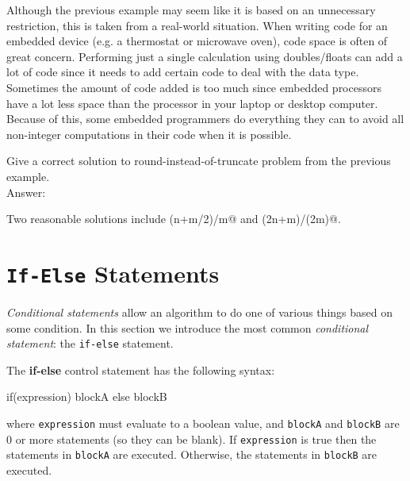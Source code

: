 Although the previous example may seem like it is based on an unnecessary restriction,
this is taken from a real-world situation.  
When writing code for an embedded device (e.g. a thermostat or microwave oven), code space
is often of great concern.  Performing just a single calculation using doubles/floats 
can add a lot of code since it needs to add certain code to deal with the data type.
Sometimes the amount of code added is too much since embedded processors have a lot
less space than the processor in your laptop or desktop computer.
Because of this,
some embedded programmers do everything they can to avoid all non-integer computations 
in their code when it is possible.  

\begin{exer}\label{exer:roundNotTruncatetwo}
Give a correct solution to round-instead-of-truncate problem from the previous example.\\
Answer:\\
\vspace*{.75in}
\begin{answer}
Two reasonable solutions include \verb@(n+m/2)/m@ and \verb@(2n+m)/(2m)@.
\end{answer}
\end{exer}

\newpage
\section{{\tt If-Else} Statements}\label{section:if}
{\em Conditional statements} allow an algorithm to 
do one of various things based on some condition.
In this section we introduce the most common 
{\em conditional statement}: the {\tt if-else} statement.

\begin{df} 
The {\bf if-else} control statement has the
following syntax:
\begin{code}
    if(expression) {
       blockA
    } else {
       blockB
    }
\end{code}

\noindent 
where \verb+expression+ must evaluate to a boolean value, 
and \verb+blockA+ and \verb+blockB+ are 0 or more statements
(so they can be blank).
If \verb+expression+ is true then the statements in \verb+blockA+ are executed. 
Otherwise, the statements in \verb+blockB+ are executed.
\end{df}

